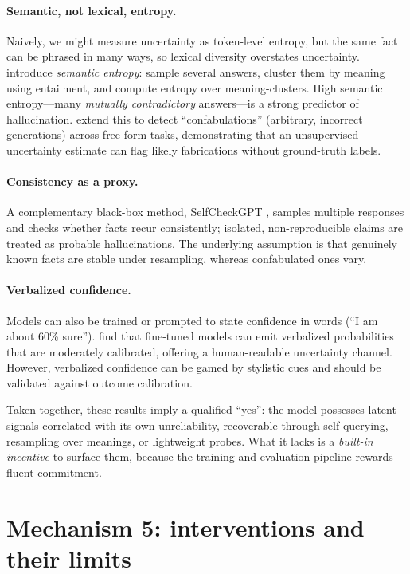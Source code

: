 \documentclass[11pt]{article}
\begin{document}
\paragraph{Semantic, not lexical, entropy.} Naively, we might measure uncertainty as token-level entropy, but the same fact can be phrased in many ways, so lexical diversity overstates uncertainty. \citet{kuhn2023semantic} introduce \emph{semantic entropy}: sample several answers, cluster them by meaning using entailment, and compute entropy over meaning-clusters. High semantic entropy---many \emph{mutually contradictory} answers---is a strong predictor of hallucination. \citet{farquhar2024semantic} extend this to detect ``confabulations'' (arbitrary, incorrect generations) across free-form tasks, demonstrating that an unsupervised uncertainty estimate can flag likely fabrications without ground-truth labels.

\paragraph{Consistency as a proxy.} A complementary black-box method, SelfCheckGPT \citep{manakul2023selfcheckgpt}, samples multiple responses and checks whether facts recur consistently; isolated, non-reproducible claims are treated as probable hallucinations. The underlying assumption is that genuinely known facts are stable under resampling, whereas confabulated ones vary.

\paragraph{Verbalized confidence.} Models can also be trained or prompted to state confidence in words (``I am about 60\% sure''). \citet{lin2022teaching} find that fine-tuned models can emit verbalized probabilities that are moderately calibrated, offering a human-readable uncertainty channel. However, verbalized confidence can be gamed by stylistic cues and should be validated against outcome calibration.

Taken together, these results imply a qualified ``yes'': the model possesses latent signals correlated with its own unreliability, recoverable through self-querying, resampling over meanings, or lightweight probes. What it lacks is a \emph{built-in incentive} to surface them, because the training and evaluation pipeline rewards fluent commitment.

\section{Mechanism 5: interventions and their limits}
\end{document}
